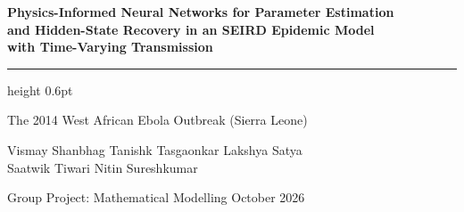 \documentclass[aspectratio=169,10pt]{beamer}
\begin{document}
\begin{frame}[plain]
\centering\vspace{10pt}
{\color{deckInk}\Large\bfseries Physics-Informed Neural Networks for Parameter Estimation\\and Hidden-State Recovery in an SEIRD Epidemic Model\\with Time-Varying Transmission\par}
\vspace{4pt}
{\color{deckAccent}\hrule height 0.6pt}
\vspace{6pt}
{\color{deckInk!70}\normalsize The 2014 West African Ebola Outbreak (Sierra Leone)\par}
\vspace{12pt}
{\small\color{deckInk}
Vismay Shanbhag \quad Tanishk Tasgaonkar \quad Lakshya Satya\\
Saatwik Tiwari \quad Nitin Sureshkumar\par}
\vspace{6pt}
{\footnotesize\color{deckInk!60}Group Project: Mathematical Modelling \quad\textbullet\quad October 2026\par}
\end{frame}










\end{document}
